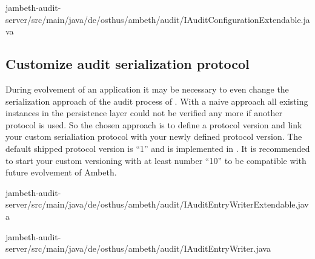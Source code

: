	{jambeth-audit-server/src/main/java/de/osthus/ambeth/audit/IAuditConfigurationExtendable.java}

\subsection{Customize audit serialization protocol}
During evolvement of an application it may be necessary to even change the serialization approach of the audit process of . With a naive approach all existing  instances in the persistence layer could not be verified any more if another protocol is used. So the chosen approach is to define a protocol version and link your custom serialiation protocol with your newly defined protocol version. The default shipped protocol version is ``1'' and is implemented in . It is recommended to start your custom versioning with at least number ``10'' to be compatible with future evolvement of Ambeth.

	{jambeth-audit-server/src/main/java/de/osthus/ambeth/audit/IAuditEntryWriterExtendable.java}

	{jambeth-audit-server/src/main/java/de/osthus/ambeth/audit/IAuditEntryWriter.java}
